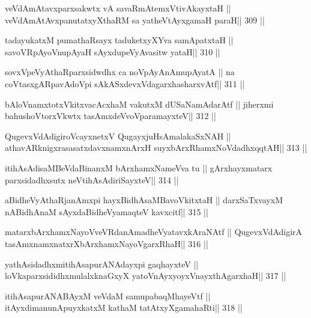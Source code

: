 \begin{shl}
veVdAmAtavxparxsakwtx vA savaRmAtemxVtivAkayxtaH ||
veVdAmAtAvxpanutatxyXthaRM sa yatheVtAyxgamaH paraH\hfill || 309 ||
\end{shl}

\begin{shl}
tadayukatxM pumathaRsayx taduketxyXYva samApatxtaH ||
savoVRpAyoV\s nupAyaH sAyxdupeVyAvasitw yataH\hfill || 310 ||
\end{shl}

\begin{shl}
sovxVpeVyAthaRparxsidwdhx ca noVpAyAnAmupAyatA ||
na coVtasxgARpavAdoV\s pi sAkASxdevxVdagarxhasharxvAtf\hfill || 311 ||
\end{shl}

\begin{shl}
bAloVnamxtotxVkitxvacAcxhaM vakutxM dUSaNamAdarAtf ||
jiherxmi bahushoV\s torxVkwtx tasAmxdeVvoVparamayxteV\hfill || 312 ||
\end{shl}

\begin{shl}
QugevxVdAdigiroVcayxnetxV QugayxjuHsAmalakaSxNAH ||
athavARknigxrasasatxdavxnamxnArxH suyxbArxRhamxNoVdadhxqqtAH\hfill || 313 ||
\end{shl}

\begin{shl}
itihAsAdisaMBeVdaBinanxM bArxhamxNameVva tu ||
gArxhayxmatarx parxsidadhxsutx neVtihAsAdiriSayxteV\hfill || 314 ||
\end{shl}

\begin{shl}
aBidheVyAthaRjanAmxpi hayxBidhAsaMBavoVkitxtaH ||
darxSaTxvayxM nABidhAnaM sAyxdaBidheVyamaqteV kavxcitf\hfill || 315 ||
\end{shl}

\begin{shl}
matarxbArxhamxNayoVveVRdanAmadheVyatavxkAraNAtf ||
QugevxVdAdigirA tasAmxnamxnatxrXbArxhamxNayoVgarxRhaH\hfill || 316 ||
\end{shl}

\begin{shl}
yathAsidadhxmitihAsapurANAdayxpi gaqhayxteV ||
loVkaparxsididhxmulalxknaGxyX yatoV\s nAyxyoyxV\s nayxthAgarxhaH\hfill || 317 ||
\end{shl}

\begin{shl}
itihAsapurANABAyxM veVdaM samupabaqMhayeVtf ||
itAyxdimanunA\s puyxkatxM kathaM tatAtxyXgamahaRti\hfill || 318 ||
\end{shl}

